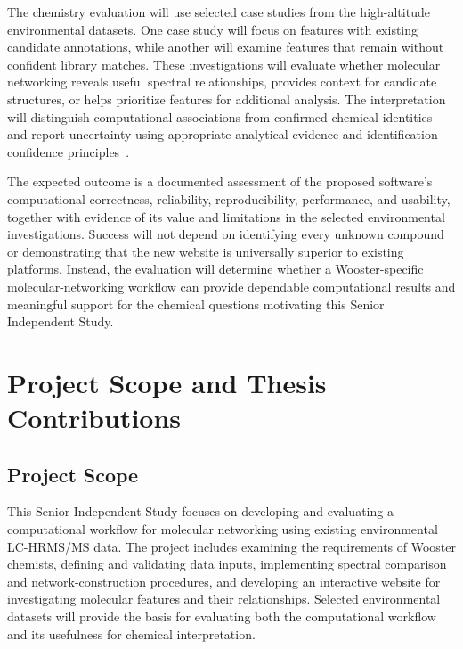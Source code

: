         The chemistry evaluation will use selected case studies from the high-altitude environmental datasets. One case study will focus on features with existing candidate annotations, while another will examine features that remain without confident library matches. These investigations will evaluate whether molecular networking reveals useful spectral relationships, provides context for candidate structures, or helps prioritize features for additional analysis. The interpretation will distinguish computational associations from confirmed chemical identities and report uncertainty using appropriate analytical evidence and identification-confidence principles~\cite{Fisher2022,Schymanski2014,Chao2025}.

        The expected outcome is a documented assessment of the proposed software's computational correctness, reliability, reproducibility, performance, and usability, together with evidence of its value and limitations in the selected environmental investigations. Success will not depend on identifying every unknown compound or demonstrating that the new website is universally superior to existing platforms. Instead, the evaluation will determine whether a Wooster-specific molecular-networking workflow can provide dependable computational results and meaningful support for the chemical questions motivating this Senior Independent Study.

\section{Project Scope and Thesis Contributions}\label{sec:scope-contributions}

    \subsection{Project Scope}\label{subsec:project-scope}

        This Senior Independent Study focuses on developing and evaluating a computational workflow for molecular networking using existing environmental LC-HRMS/MS data. The project includes examining the requirements of Wooster chemists, defining and validating data inputs, implementing spectral comparison and network-construction procedures, and developing an interactive website for investigating molecular features and their relationships. Selected environmental datasets will provide the basis for evaluating both the computational workflow and its usefulness for chemical interpretation.

